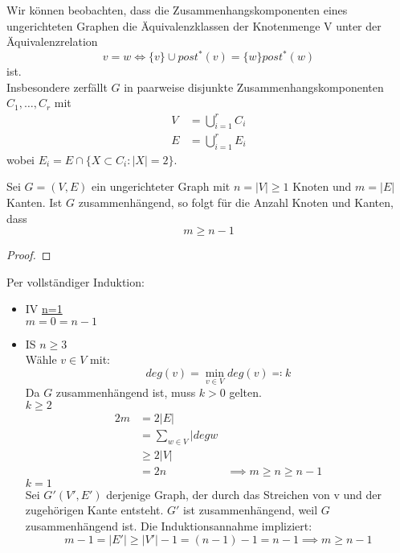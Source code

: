 Wir können beobachten, dass die Zusammenhangskomponenten eines ungerichteten Graphen die Äquivalenzklassen der Knotenmenge V unter der Äquivalenzrelation
\[
v=w \iff \{v\} \cup post^{*}(v) = \{w\} post^{*}(w) 
\]
ist. \\
Insbesondere zerfällt $G$ in paarweise disjunkte Zusammenhangskomponenten $C_1,\ldots, C_r$ mit
\begin{align*}
	V &= \bigcup_{i=1}^{r} C_i \\
	E &= \bigcup_{i=1}^{r}E_i
\end{align*}
wobei $E_i= E \cap \{X \subset C_i : |X|=2\}$.

\begin{theorem}
	\label{thm:zusammenhang}
	Sei $G=(V,E)$ ein ungerichteter Graph mit $n=|V| \ge 1$ Knoten und $m=|E|$ Kanten. Ist $G$ zusammenhängend, so folgt für die Anzahl Knoten und Kanten, dass 
\[
m \ge n-1
\]
\end{theorem}
\begin{proof}

\end{proof}
Per vollständiger Induktion:

\begin{itemize}[label=$\lozenge$, itemsep=2ex]
	\item IV \underline{n=1} \\ $m=0=n-1$
	\item IS \underline{$n \ge 3$} \\ Wähle $v \in  V$ mit:
		\[
		deg(v)= \min_{v \in V} deg(v) \eqqcolon k
		\]
		Da $G$ zusammenhängend ist, muss $k>0$ gelten. \\
		\underline{$k\ge 2$}
		\begin{align*}
		2m 
		&= 2|E| \\
		&= \sum_{w \in V} |deg{w} \\
		&\ge 2 |V| \\
		&= 2n 
		&\implies m\ge n\ge n-1
		\end{align*}
	\underline{$k=1$} \\ Sei $G'(V',E')$ derjenige Graph, der durch das Streichen von v und der zugehörigen Kante entsteht. $G'$ ist zusammenhängend, weil $G$ zusammenhängend ist. Die Induktionsannahme impliziert:
	\[
m-1=|E'| \ge |V'|-1 =(n-1)-1 = n-1 \implies m \ge n-1
	\]
\end{itemize}
